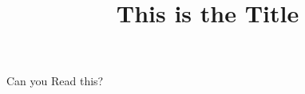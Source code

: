 \documentclass{ximera}
\title{This is the Title}
\begin{document}
Can you Read this?
\end{document}
